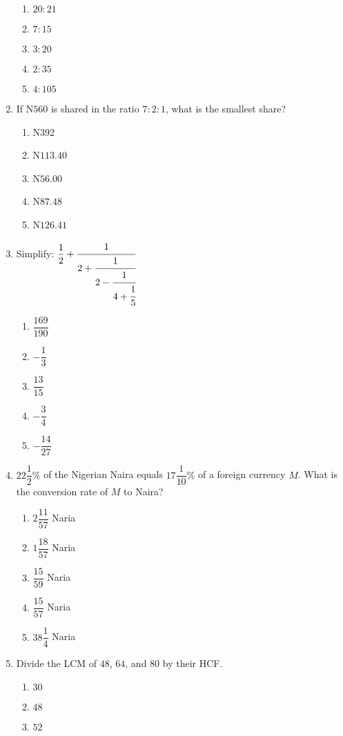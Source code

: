 \begin{multicols}{2}
\begin{enumerate}[label={\arabic*.}]
\begin{enumerate}[label={\Alph*.}]
    \item \(20:21\)
    \item \(7:15\)
    \item \(3:20\)
    \item \(2:35\)
    \item \(4:105\)
    \end{enumerate}
\item If N\(560\) is shared in the ratio \(7:2:1\), what is the smallest share?
    \begin{enumerate}[label={\Alph*.}]
    \item N\(392\)
    \item N\(113.40\)
    \item N\(56.00\)
    \item N\(87.48\)
    \item N\(126.41\)
    \end{enumerate}
\item Simplify: \(\dfrac{1}{2} + \cfrac{1}{2 + \cfrac{1}{2 - \cfrac{1}{4 + \cfrac{1}{5}}}}\)
    \begin{enumerate}[label={\Alph*.}]
    \item \(\dfrac{169}{190}\)
    \item \(-\dfrac{1}{3}\)
    \item \(\dfrac{13}{15}\)
    \item \(-\dfrac{3}{4}\)
    \item \(-\dfrac{14}{27}\)
    \end{enumerate}
\item \(22{\dfrac{1}{2}}\%\) of the Nigerian Naira equals \(17{\dfrac{1}{10}}\%\) of a foreign currency \(M\). What is the conversion rate of \(M\) to Naira?
    \begin{enumerate}[label={\Alph*.}]
    \item \(2\dfrac{11}{57}\) Naria
    \item \(1\dfrac{18}{57}\) Naria
    \item \(\dfrac{15}{59}\) Naria
    \item \(\dfrac{15}{57}\) Naria
    \item \(38\dfrac{1}{4}\) Naria
    \end{enumerate}
\item Divide the LCM of \(48\), \(64\), and \(80\) by their HCF.
    \begin{enumerate}[label={\Alph*.}]
    \item \(30\)
    \item \(48\)
    \item \(52\)

\end{enumerate}
\end{enumerate}
\end{multicols}
